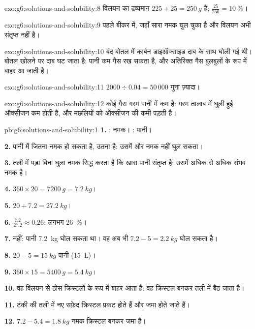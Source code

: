 \begin{solution}{exo:g6:solutions-and-solubility:8}
विलयन का द्रव्यमान $225 + 25 = \qty{250}{g}$ है; $\frac{25}{250} =
\qty{10}{\percent}$।
\end{solution}

\begin{solution}{exo:g6:solutions-and-solubility:9}
पहले बीकर में, जहाँ सारा नमक घुल चुका है और विलयन अभी
संतृप्त नहीं है।
\end{solution}

\begin{solution}{exo:g6:solutions-and-solubility:10}
बंद बोतल में कार्बन डाइऑक्साइड दाब के साथ घोली गई थी। बोतल खोलने पर दाब
घट जाता है: पानी कम गैस रख सकता है, और अतिरिक्त गैस बुलबुलों के रूप में
बाहर आ जाती है।
\end{solution}

\begin{solution}{exo:g6:solutions-and-solubility:11}
$2000 \div 0.04 = 50\,000$ गुना ज़्यादा।
\end{solution}

\begin{solution}{exo:g6:solutions-and-solubility:12}
कोई गैस गरम पानी में कम  है: गरम तालाब में घुली हुई ऑक्सीजन कम
होती है, और मछलियों को ऑक्सीजन की कमी पड़ती है।
\end{solution}

\begin{solution}{pb:g6:solutions-and-solubility:1}
\textbf{1.} : नमक। : पानी।

\textbf{2.} पानी में जितना नमक हो सकता है, उतना है: उसमें और नमक नहीं
घुल सकता।

\textbf{3.} तली में पड़ा बिना घुला नमक सिद्ध करता है कि खारा पानी
संतृप्त है: उसमें अधिक से अधिक संभव नमक है।

\textbf{4.} $360 \times 20 = \qty{7200}{g} = \qty{7.2}{kg}$।

\textbf{5.} $20 + 7.2 = \qty{27.2}{kg}$।

\textbf{6.} $\frac{7.2}{27.2} \approx 0.26$: लगभग \qty{26}{\percent}।

\textbf{7.} नहीं: पानी \qty{7.2}{kg} घोल सकता था। वह अब भी
$7.2 - 5 = \qty{2.2}{kg}$ घोल सकता है।

\textbf{8.} $20 - 5 = \qty{15}{kg}$ पानी (\qty{15}{L})।

\textbf{9.} $360 \times 15 = \qty{5400}{g} = \qty{5.4}{kg}$।

\textbf{10.} वह विलयन से ठोस क्रिस्टलों के रूप में बाहर आता है: वह
क्रिस्टल बनकर तली में बैठ जाता है।

\textbf{11.} टंकी की तली में नए सफ़ेद क्रिस्टल प्रकट होते हैं और जमा होते
जाते हैं।

\textbf{12.} $7.2 - 5.4 = \qty{1.8}{kg}$ नमक क्रिस्टल बनकर जमा है।
\end{solution}
